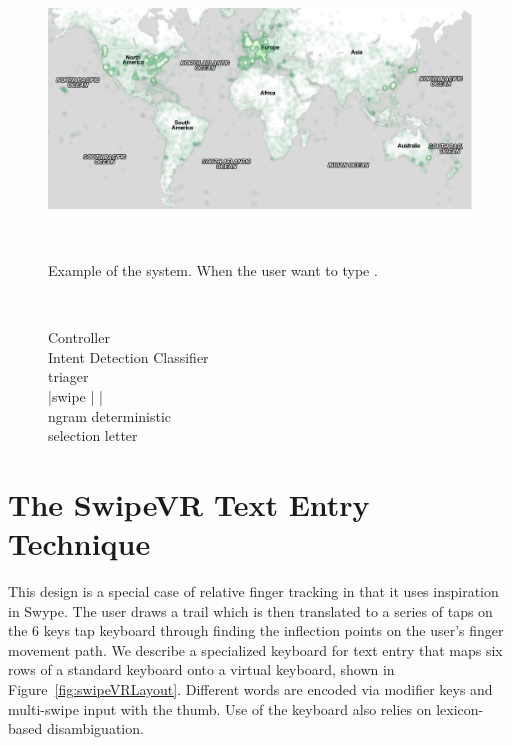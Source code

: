 \documentclass{sigchi}
\begin{document}
\begin{figure}
  \centering
  \includegraphics[width=1.75\columnwidth]{figures/map}
  \caption{Example of the system.  When the user want to type .}
  ~\label{fig:example}
\end{figure}



\begin{figure}
\centering


	\caption{
    Controller\\
	Intent Detection Classifier\\
    triager \\
	|swipe          |                |\\
    ngram           deterministic     \\
    selection        letter           \\
}~\label{fig:systemFlowchart}
\end{figure}

\section{The SwipeVR Text Entry Technique}


This design is a special case of relative finger tracking in that it uses inspiration in Swype. 
The user draws a trail which is then translated to a series of taps on the 6 keys tap keyboard through finding the inflection points on the user's finger movement path.
We describe a specialized keyboard for text entry that maps six rows of a standard keyboard onto a virtual keyboard, shown in Figure~\ref{fig:swipeVRLayout}.
Different words are encoded via modifier keys and multi-swipe input with the thumb.
Use of the keyboard also relies on lexicon-based disambiguation.
\end{document}
